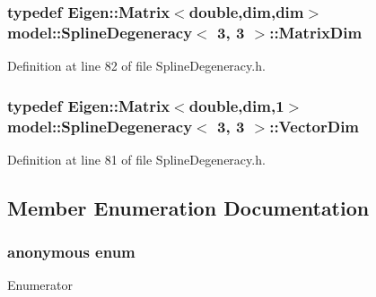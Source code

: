 \subsubsection[{Matrix\+Dim}]{\setlength{\rightskip}{0pt plus 5cm}typedef Eigen\+::\+Matrix$<$double,{\bf dim},{\bf dim}$>$ {\bf model\+::\+Spline\+Degeneracy}$<$ 3, 3 $>$\+::{\bf Matrix\+Dim}}\label{structmodel_1_1_spline_degeneracy_3_013_00_013_01_4_a016b56948871fb7d1c223f8ccb6b9f70}


Definition at line 82 of file Spline\+Degeneracy.\+h.

\hypertarget{structmodel_1_1_spline_degeneracy_3_013_00_013_01_4_a58d2053b56b3f1a8cce4c07098c0039a}{}
\subsubsection[{Vector\+Dim}]{\setlength{\rightskip}{0pt plus 5cm}typedef Eigen\+::\+Matrix$<$double,{\bf dim},1$>$ {\bf model\+::\+Spline\+Degeneracy}$<$ 3, 3 $>$\+::{\bf Vector\+Dim}}\label{structmodel_1_1_spline_degeneracy_3_013_00_013_01_4_a58d2053b56b3f1a8cce4c07098c0039a}


Definition at line 81 of file Spline\+Degeneracy.\+h.



\subsection{Member Enumeration Documentation}
\hypertarget{structmodel_1_1_spline_degeneracy_3_013_00_013_01_4_a3572507efca566685b67cf5412b870c6}{}\subsubsection[{anonymous enum}]{\setlength{\rightskip}{0pt plus 5cm}anonymous enum}\label{structmodel_1_1_spline_degeneracy_3_013_00_013_01_4_a3572507efca566685b67cf5412b870c6}
\begin{Desc}
\item[Enumerator]\par
\begin{description}
\item[{\em 
\hypertarget{structmodel_1_1_spline_degeneracy_3_013_00_013_01_4_a3572507efca566685b67cf5412b870c6a56bf1ade339b58476d01e9aa1dc7a292}{}dim\label{structmodel_1_1_spline_degeneracy_3_013_00_013_01_4_a3572507efca566685b67cf5412b870c6a56bf1ade339b58476d01e9aa1dc7a292}
}]\end{description}
\end{Desc}



